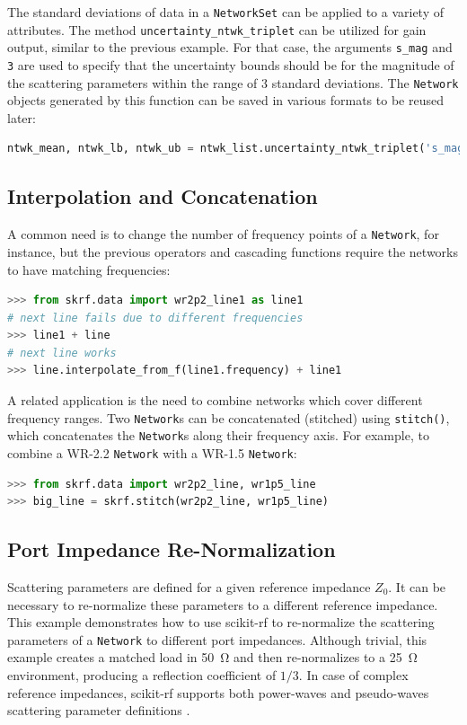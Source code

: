 \documentclass[10pt, letterpaper]{scrartcl}
\newcommand{\skrf}{{s}cikit-rf\xspace}
\begin{document}
The standard deviations of data in a \texttt{NetworkSet} can be applied to a variety of attributes. The method \texttt{uncertainty\_ntwk\_triplet} can be utilized for gain output, similar to the previous example. For that case, the arguments \texttt{s\_mag} and \texttt{3} are used to specify that the uncertainty bounds should be for the magnitude of the scattering parameters within the range of 3 standard deviations. The \texttt{Network} objects generated by this function can be saved in various formats to be reused later:

\begin{lstlisting}[language=Python]
ntwk_mean, ntwk_lb, ntwk_ub = ntwk_list.uncertainty_ntwk_triplet('s_mag', 3)
\end{lstlisting}

\subsection{Interpolation and Concatenation}
A common need is to change the number of frequency points of a \texttt{Network}, for instance, but the previous operators and cascading functions require the networks to have matching frequencies:

\begin{lstlisting}[language=Python]
>>> from skrf.data import wr2p2_line1 as line1
# next line fails due to different frequencies
>>> line1 + line 
# next line works
>>> line.interpolate_from_f(line1.frequency) + line1  
\end{lstlisting}

A related application is the need to combine networks which cover different frequency ranges. Two \texttt{Network}s can be concatenated (stitched) using \texttt{stitch()}, which concatenates the \texttt{Network}s along their frequency axis. For example, to combine a WR-2.2 \texttt{Network} with a WR-1.5 \texttt{Network}:

\begin{lstlisting}[language=Python]
>>> from skrf.data import wr2p2_line, wr1p5_line
>>> big_line = skrf.stitch(wr2p2_line, wr1p5_line)
\end{lstlisting}

\subsection{Port Impedance Re-Normalization}
Scattering parameters are defined for a given reference impedance $Z_0$. It can be necessary to re-normalize these parameters to a different reference impedance. This example demonstrates how to use \skrf{} to re-normalize the  scattering parameters of a \texttt{Network} to different port impedances. Although trivial, this example creates a matched load in \SI{50}{\ohm} and then re-normalizes to a \SI{25}{\ohm} environment, producing a reflection coefficient of $1/3$. In case of complex reference impedances, \skrf{} supports both power-waves and pseudo-waves scattering parameter definitions \cite{williams2013}.
\end{document}
